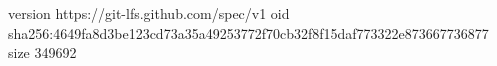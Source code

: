 version https://git-lfs.github.com/spec/v1
oid sha256:4649fa8d3be123cd73a35a49253772f70cb32f8f15daf773322e873667736877
size 349692
